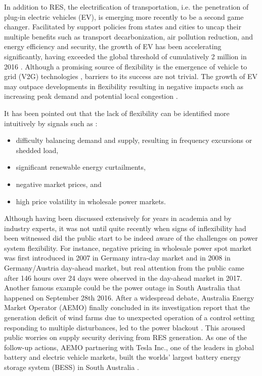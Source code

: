 In addition to RES, the electrification of transportation, i.e. the penetration of plug-in electric vehicles (EV), is emerging more recently to be a second game changer. Facilitated by support policies from states and cities to uncap their multiple benefits such as transport decarbonization, air pollution reduction, and energy efficiency and security, the growth of EV has been accelerating significantly, having exceeded the global threshold of cumulatively 2 million in 2016 \cite{InternationalEnergyAgency2017}. Although a promising source of flexibility is the emergence of vehicle to grid (V2G) technologies \cite{Size2016,Habib2015,Foley2013}, barriers to its success are not trivial. The growth of EV may outpace developments in flexibility resulting in negative impacts such as increasing peak demand and potential local congestion \cite{Green2011,DBLP:journals/corr/PournarasJZFS17}.

It has been pointed out that the lack of flexibility can be identified more intuitively by signals such as \cite{Cochran2014,Wang2017}:
\begin{itemize}
	\item difficulty balancing demand and supply, resulting in frequency excursions or shedded load,
	\item significant renewable energy curtailments,
	\item negative market prices, and
	\item high price volatility in wholesale power markets.
\end{itemize}

Although having been discussed extensively for years in academia and by industry experts, it was not until quite recently when signs of inflexibility had been witnessed did the public start to be indeed aware of the challenges on power system flexibility. For instance, negative pricing in wholesale power spot market was first introduced in 2007 in Germany intra-day market and in 2008 in Germany/Austria day-ahead market\cite{EPEX_negative_price}, but real attention from the public came after 146 hours over 24 days were observed in the day-ahead market in 2017. Another famous example could be the power outage in South Australia that happened on September 28th 2016. After a widespread debate, Australia Energy Market Operator (AEMO) finally concluded in its investigation report that the generation deficit of wind farms due to unexpected operation of a control setting responding to multiple disturbances, led to the power blackout \cite{AEMO2016SA}.  This aroused public worries on supply security deriving from RES generation. As one of the follow-up actions, AEMO partnering with Tesla Inc., one of the leaders in global battery and electric vehicle markets,  built the worlds' largest battery energy storage system (BESS) in South Australia \cite{AEMO_tesla}.

